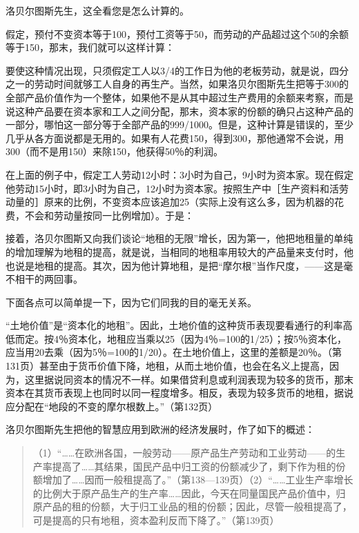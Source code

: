 洛贝尔图斯先生，这全看您是怎么计算的。

假定，预付不变资本等于100，预付工资等于50，而劳动的产品超过这个50的余额等于150，那末，我们就可以这样计算：

\todo{}

要使这种情况出现，只须假定工人以3/4的工作日为他的老板劳动，就是说，四分之一的劳动时间就够工人自身的再生产。当然，如果洛贝尔图斯先生把等于300的全部产品价值作为一个整体，如果他不是从其中超过生产费用的余额来考察，而是说这种产品要在资本家和工人之间分配，那末，资本家的份额的确只占这种产品的一部分，哪怕这一部分等于全部产品的999/1000。但是，这种计算是错误的，至少几乎从各方面说都是无用的。如果有人花费150，得到300，那他通常不会说，用300（而不是用150）来除150，他获得50％的利润。

在上面的例子中，假定工人劳动12小时：3小时为自己，9小时为资本家。现在假定他劳动15小时，即3小时为自己，12小时为资本家。按照生产中［生产资料和活劳动量的］原来的比例，不变资本应该追加25（实际上没有这么多，因为机器的花费，不会和劳动量按同一比例增加）。于是：

\todo{}

接着，洛贝尔图斯又向我们谈论“地租的无限”增长，因为第一，他把地租量的单纯的增加理解为地租的提高，就是说，当相同的地租率用较大的产品量来支付时，他也说是地租的提高。其次，因为他计算地租，是把“摩尔根”当作尺度，——这是毫不相干的两回事。


下面各点可以简单提一下，因为它们同我的目的毫无关系。

“土地价值”是“资本化的地租”。因此，土地价值的这种货币表现要看通行的利率高低而定。按4％资本化，地租应当乘以25（因为4％=100的1/25）；按5％资本化，应当用20去乘（因为5％=100的1/20）。在土地价值上，这里的差额是20％。（第131页）甚至由于货币价值下降，地租，从而土地价值，也会在名义上提高，因为，这里据说同资本的情况不一样。如果借贷利息或利润表现为较多的货币，那末资本在其货币表现上也同时以同一程度增多。相反，表现为较多货币的地租，据说应分配在“地段的不变的摩尔根数上。”（第132页）

洛贝尔图斯先生把他的智慧应用到欧洲的经济发展时，作了如下的概述：

\begin{quote}{（1）“……在欧洲各国，一般劳动——原产品生产劳动和工业劳动——的生产率提高了……其结果，国民产品中归工资的份额减少了，剩下作为租的份额增加了……因而一般租提高了。”（第138—139页）（2）“……工业生产率增长的比例大于原产品生产的生产率……因此，今天在同量国民产品价值中，归原产品的租的份额，大于归工业品的租的份额；因此，尽管一般租提高了，可是提高的只有地租，资本盈利反而下降了。”（第139页）}\end{quote}

